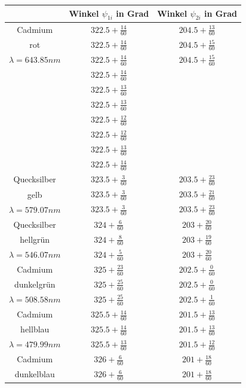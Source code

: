 \documentclass[12pt,a4paper]{article}
\begin{document}
\begin{table}[h!]
	\centering
	\begin{tabular}{|c|c|c|}
		\hline
		& Winkel $\psi_{1i}$ in Grad & Winkel $\psi_{2i}$ in Grad\\
		\hline
		Cadmium&$322.5+\frac{14}{60}$&$204.5+\frac{13}{60}$\\[0.1cm]
		rot&$322.5+\frac{14}{60}$&$204.5+\frac{15}{60}$\\[0.1cm]
		$\lambda=643.85nm$&$322.5+\frac{14}{60}$&$204.5+\frac{15}{60}$\\[0.1cm]
		&$322.5+\frac{14}{60}$&\\[0.1cm]
		&$322.5+\frac{13}{60}$&\\[0.1cm]
		&$322.5+\frac{13}{60}$&\\[0.1cm]
		&$322.5+\frac{12}{60}$&\\[0.1cm]
		&$322.5+\frac{12}{60}$&\\[0.1cm]
		&$322.5+\frac{13}{60}$&\\[0.1cm]
		&$322.5+\frac{14}{60}$&\\[0.1cm]
		\hline
		Quecksilber&$323.5+\frac{3}{60}$&$203.5+\frac{23}{60}$\\[0.1cm]
		gelb&$323.5+\frac{3}{60}$&$203.5+\frac{21}{60}$\\[0.1cm]
		$\lambda=579.07nm$&$323.5+\frac{3}{60}$&$203.5+\frac{23}{60}$\\[0.1cm]
		\hline
		Quecksilber&$324+\frac{6}{60}$&$203+\frac{20}{60}$\\[0.1cm]
		hellgrün&$324+\frac{8}{60}$&$203+\frac{19}{60}$\\[0.1cm]
		$\lambda=546.07nm$&$324+\frac{5}{60}$&$203+\frac{20}{60}$\\[0.1cm]
		\hline
		Cadmium&$325+\frac{23}{60}$&$202.5+\frac{0}{60}$\\[0.1cm]
		dunkelgrün&$325+\frac{25}{60}$&$202.5+\frac{0}{60}$\\[0.1cm]
		$\lambda=508.58nm$&$325+\frac{25}{60}$&$202.5+\frac{1}{60}$\\[0.1cm]
		\hline
		Cadmium&$325.5+\frac{14}{60}$&$201.5+\frac{13}{60}$\\[0.1cm]
		hellblau&$325.5+\frac{14}{60}$&$201.5+\frac{13}{60}$\\[0.1cm]
		$\lambda=479.99nm$&$325.5+\frac{13}{60}$&$201.5+\frac{12}{60}$\\[0.1cm]
		\hline
		Cadmium&$326+\frac{6}{60}$&$201+\frac{18}{60}$\\[0.1cm]
		dunkelblau&$326+\frac{6}{60}$&$201+\frac{18}{60}$\\[0.1cm]

\end{tabular}
\end{table}
\end{document}
